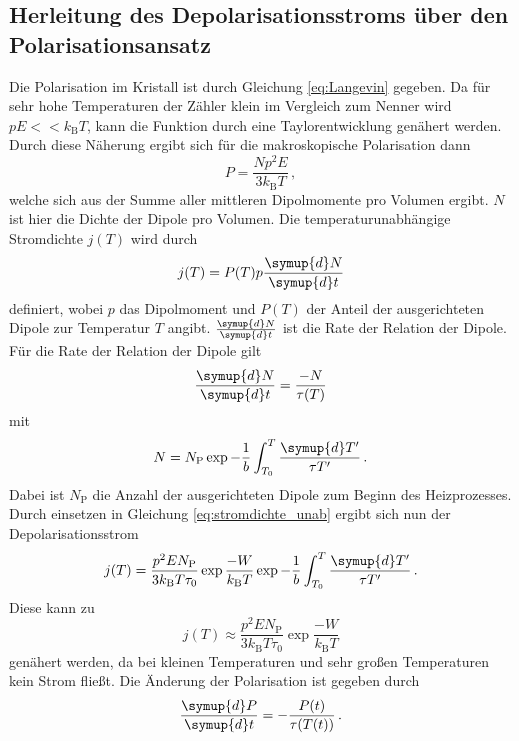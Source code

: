 \subsection{Herleitung des Depolarisationsstroms über den Polarisationsansatz}
\label{sec:polarisationsansatz}
Die Polarisation im Kristall ist durch Gleichung \eqref{eq:Langevin} gegeben.
Da für sehr hohe Temperaturen der Zähler klein im Vergleich zum Nenner wird $pE << k_\text{B} T$, kann die Funktion durch eine Taylorentwicklung genähert werden.
Durch diese Näherung ergibt sich für die makroskopische Polarisation dann
\begin{equation}
    P = \frac{Np^2E}{3 k_\text{B}T} \, ,
    \label{eq:langevin2}
\end{equation}
welche sich aus der Summe aller mittleren Dipolmomente pro Volumen ergibt.
$N$ ist hier die Dichte der Dipole pro Volumen.
Die temperaturunabhängige Stromdichte $j(T)$ wird durch
\begin{equation}
    j(T) = P(T)p \frac{\symup{d}N}{\symup{d}t}
    \label{eq:stromdichte_unab}
\end{equation}
definiert, wobei $p$ das Dipolmoment und $P(T)$ der Anteil der ausgerichteten Dipole zur Temperatur $T$ angibt.
$\frac{\symup{d}N}{\symup{d}t}$ ist die Rate der Relation der Dipole.
Für die Rate der Relation der Dipole gilt
\begin{equation}
    \frac{\symup{d}N}{\symup{d}t} = \frac{-N}{\tau(T)}
\end{equation}
mit 
\begin{equation}
    N = N_\text{P} \exp{-\frac{1}{b} \int_{T_0}^{T} \frac{\symup{d}T'}{\tau{T'}}} \, .
\end{equation}
Dabei ist $N_\text{P}$ die Anzahl der ausgerichteten Dipole zum Beginn des Heizprozesses.
Durch einsetzen in Gleichung \eqref{eq:stromdichte_unab} ergibt sich nun der Depolarisationsstrom
\begin{equation}
    j(T) = \frac{p^2EN_\text{P}}{3 k_\text{B}T\tau_0} \exp{\frac{-W}{k_\text{B}T}} \exp{-\frac{1}{b} \int_{T_0}^{T} \frac{\symup{d}T'}{\tau{T'}}} \, .
\end{equation}
Diese kann zu
\begin{equation}
    j(T) \approx  \frac{p^2EN_\text{P}}{3 k_\text{B}T\tau_0} \exp{\frac{-W}{k_\text{B}T}}
\end{equation}
genähert werden, da bei kleinen Temperaturen und sehr großen Temperaturen kein Strom fließt.
Die Änderung der Polarisation ist gegeben durch
\begin{equation*}
    \frac{\symup{d}P}{\symup{d}t}=-\frac{P(t)}{\tau(T(t))} \, .
\end{equation*}
